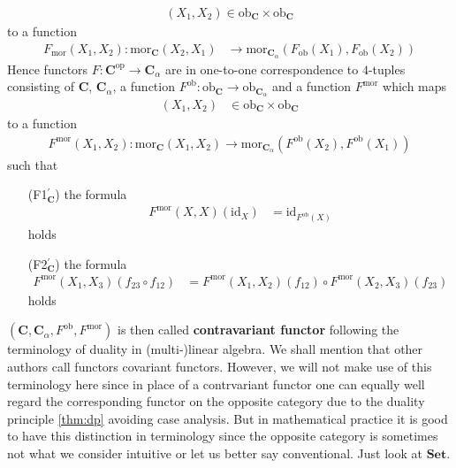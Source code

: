 \begin{align*}
  (X_{1},X_{2})
  \in
  \mathrm{ob}_{\mathbf{C}}
  \times
  \mathrm{ob}_{\mathbf{C}}
\end{align*}
to a function
\begin{align*}
  F_{\mathrm{mor}}(X_{1},X_{2})
  \colon
  \mathrm{mor}_{\mathbf{C}}(X_{2},X_{1})
  &\rightarrow
  \mathrm{mor}_{\mathbf{C}_{\alpha}}
  (F_{\mathrm{ob}}(X_{1}),F_{\mathrm{ob}}(X_{2}))
\end{align*}
Hence functors $F \colon \mathbf{C}^{\mathrm{op}} \rightarrow \mathbf{C}_{\alpha}$ are in one-to-one correspondence to $4$-tuples consisting of $\mathbf{C}$, $\mathbf{C}_{\alpha}$, a function $F^{\mathrm{ob}} \colon \mathrm{ob}_{\mathbf{C}} \rightarrow \mathrm{ob}_{\mathbf{C}_{\alpha}}$ and a function $F^{\mathrm{mor}}$ which maps
\begin{align*}
  (X_{1},X_{2})
  &\in
  \mathrm{ob}_{\mathbf{C}}
  \times
  \mathrm{ob}_{\mathbf{C}}
\end{align*}
to a function
\begin{align*}
  F^{\mathrm{mor}}(X_{1},X_{2})
  \colon
  \mathrm{mor}_{\mathbf{C}}(X_{1},X_{2})
  \rightarrow
  \mathrm{mor}_{\mathbf{C}_{\alpha}}
  (F^{\mathrm{ob}}(X_{2}),F^{\mathrm{ob}}(X_{1}))
\end{align*}
such that
\begin{enumerate}
\item[(F1$_{\mathbf{C}}^{\prime}$)]
the formula
\begin{align*}
  F^{\mathrm{mor}}(X,X)(\mathrm{id}_{X})
  &=
  \mathrm{id}_{F^{\mathrm{ob}}(X)}
\end{align*}
holds
\item[(F2$_{\mathbf{C}}^{\prime}$)]
the formula
\begin{align*}
  F^{\mathrm{mor}}(X_{1},X_{3})(f_{23} \circ f_{12})
  &=
  F^{\mathrm{mor}}(X_{1},X_{2})(f_{12})
  \circ
  F^{\mathrm{mor}}(X_{2},X_{3})(f_{23})
\end{align*}  
holds
\end{enumerate}
$(\mathbf{C},\mathbf{C}_{\alpha},F^{\mathrm{ob}},F^{\mathrm{mor}})$ is then called \textbf{contravariant functor} following the terminology of duality in (multi-)linear algebra. We shall mention that other authors call functors covariant functors. However, we will not make use of this terminology here since in place of a contrvariant functor one can equally well regard the corresponding functor on the opposite category due to the duality principle \ref{thm:dp} avoiding case analysis. But in mathematical practice it is good to have this distinction in terminology since the opposite category is sometimes not what we consider intuitive or let us better say conventional. Just look at $\mathbf{Set}$.
